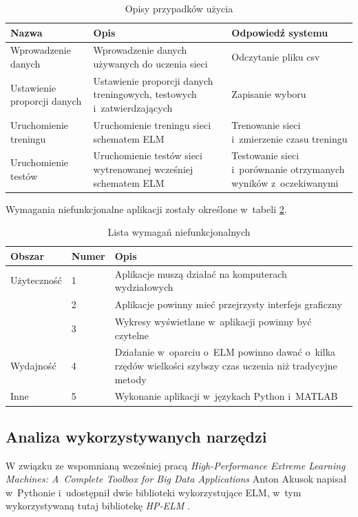 \documentclass{article}
\begin{document}
\begin{table}[H]
\caption{Opisy przypadków użycia}
\label{use_case_tab}
\begin{tabular}{|p{3.4cm}|p{5cm}|p{4cm}|}
\hline
\textbf{Nazwa} & \textbf{Opis} & \textbf{Odpowiedź systemu} \\
\hline
Wprowadzenie danych & Wprowadzenie danych używanych do uczenia sieci & Odczytanie pliku csv \\ \hline
Ustawienie proporcji danych & Ustawienie proporcji danych treningowych, testowych i~zatwierdzających & Zapisanie wyboru \\ \hline
Uruchomienie treningu & Uruchomienie treningu sieci schematem ELM & Trenowanie sieci i~zmierzenie czasu treningu \\ \hline
Uruchomienie testów & Uruchomienie testów sieci wytrenowanej wcześniej schematem ELM & Testowanie sieci i~porównanie otrzymanych wyników z~oczekiwanymi \\
\hline
\end{tabular}
\end{table}

Wymagania niefunkcjonalne aplikacji zostały określone w~tabeli \ref{niefunkcjonalne}.
\begin{table}[H]
\caption{Lista wymagań niefunkcjonalnych}
\label{niefunkcjonalne}
\begin{tabular}{|l|l|p{9.4cm}|}
\hline
\textbf{Obszar} & \textbf{Numer} & \textbf{Opis} \\
\hline
Użyteczność & 1 & Aplikacje muszą działać na komputerach wydziałowych \\
 & 2 & Aplikacje powinny mieć przejrzysty interfejs graficzny \\
 & 3 & Wykresy wyświetlane w~aplikacji powinny być czytelne \\
\hline
Wydajność & 4 & Działanie w~oparciu o~ELM powinno dawać o~kilka rzędów wielkości szybszy czas uczenia niż tradycyjne metody \\
\hline 
Inne & 5 & Wykonanie aplikacji w~językach Python i~MATLAB \\
\hline
\end{tabular}
\end{table}
\subsection{Analiza wykorzystywanych narzędzi}
W związku ze wspomnianą wcześniej pracą \textit{High-Performance Extreme Learning Machines: A~Complete Toolbox for Big Data Applications} Anton Akusok napisał w~Pythonie i~udostępnił dwie biblioteki wykorzystujące ELM, w~tym wykorzystywaną tutaj bibliotekę \textit{HP-ELM} \cite{hpelm}.
\end{document}
